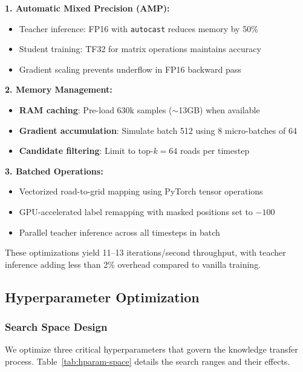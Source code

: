 \textbf{1. Automatic Mixed Precision (AMP):}
\begin{itemize}[noitemsep,topsep=0pt]
\item Teacher inference: FP16 with \texttt{autocast} reduces memory by 50\%
\item Student training: TF32 for matrix operations maintains accuracy
\item Gradient scaling prevents underflow in FP16 backward pass
\end{itemize}

\textbf{2. Memory Management:}
\begin{itemize}[noitemsep,topsep=0pt]
\item \textbf{RAM caching}: Pre-load 630k samples ($\sim$13GB) when available
\item \textbf{Gradient accumulation}: Simulate batch 512 using 8 micro-batches of 64
\item \textbf{Candidate filtering}: Limit to top-$k=64$ roads per timestep
\end{itemize}

\textbf{3. Batched Operations:}
\begin{itemize}[noitemsep,topsep=0pt]
\item Vectorized road-to-grid mapping using PyTorch tensor operations
\item GPU-accelerated label remapping with masked positions set to $-100$
\item Parallel teacher inference across all timesteps in batch
\end{itemize}

These optimizations yield 11--13 iterations/second throughput, with teacher inference adding less than 2\% overhead compared to vanilla training.

\subsection{Hyperparameter Optimization}
\label{sec:method-hparam}

\subsubsection{Search Space Design}
We optimize three critical hyperparameters that govern the knowledge transfer process. Table~\ref{tab:hparam-space} details the search ranges and their effects.

